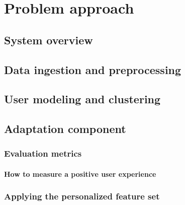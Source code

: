 \chapter{Problem approach}

\label{Chapter3}


\section{System overview} %
\label{sec:system_overview}


\section{Data ingestion and preprocessing} %
\label{sec:data_ingestion_and_preprocessing}


\section{User modeling and clustering} %
\label{sec:user_modeling_and_clustering}


\section{Adaptation component} %
\label{sec:adaptation_component}

\subsection{Evaluation metrics} %
\label{sub:evaluation_metrics}

\subsubsection{How to measure a positive user experience} %


\subsection{Applying the personalized feature set} %
\label{sub:applying_the_personalized_feature_set}

